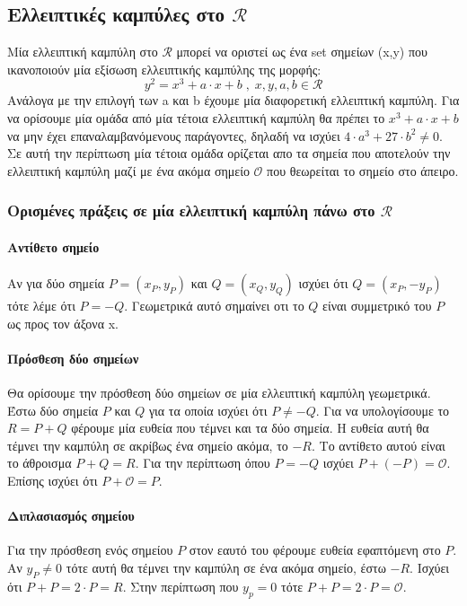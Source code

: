 \documentclass[12pt]{article}
\begin{document}
\subsection{Ελλειπτικές καμπύλες στο $\mathcal{R}$}
Μία ελλειπτική καμπύλη στο $\mathcal{R}$ μπορεί να οριστεί ως ένα set σημείων (x,y) που ικανοποιούν μία εξίσωση ελλειπτικής καμπύλης της μορφής: 
$$y^2 = x^3 + a \cdot x + b \; , \; x,y,a,b \in \mathcal{R}$$
Ανάλογα με την επιλογή των a και b έχουμε μία διαφορετική ελλειπτική καμπύλη. Για να ορίσουμε μία ομάδα από μία τέτοια ελλειπτική καμπύλη θα πρέπει το $x^3 + a \cdot x + b$ να μην έχει επαναλαμβανόμενους παράγοντες, δηλαδή να ισχύει $4 \cdot a^3 + 27 \cdot b^2 \neq 0$. Σε αυτή την περίπτωση μία τέτοια ομάδα ορίζεται απο τα σημεία που αποτελούν την ελλειπτική καμπύλη μαζί με ένα ακόμα σημείο $\mathcal{O}$ που θεωρείται το σημείο στο άπειρο.
\subsubsection{Ορισμένες πράξεις σε μία ελλειπτική καμπύλη πάνω στο $\mathcal{R}$}
\paragraph{Αντίθετο σημείο}
Αν για δύο σημεία $P = (x_P, y_P)$ και $Q = (x_Q, y_Q)$ ισχύει ότι $Q = (x_P, -y_P)$ τότε λέμε ότι $P = -Q$. Γεωμετρικά αυτό σημαίνει οτι το $Q$ είναι συμμετρικό του $P$ ως προς τον άξονα x.
\paragraph{Πρόσθεση δύο σημείων}
Θα ορίσουμε την πρόσθεση δύο σημείων σε μία ελλειπτική καμπύλη γεωμετρικά. Έστω δύο σημεία $P$ και $Q$ για τα οποία ισχύει ότι $P \neq -Q$. Για να υπολογίσουμε το $R = P + Q$ φέρουμε μία ευθεία που τέμνει και τα δύο σημεία. Η ευθεία αυτή θα τέμνει την καμπύλη σε ακρίβως ένα σημείο ακόμα, το $-R$. Το αντίθετο αυτού είναι το άθροισμα $P+Q = R$. 
Για την περίπτωση όπου $P = -Q$ ισχύει $P + (-P) = \mathcal{O}$.
Επίσης ισχύει ότι $P +\mathcal{O} = P$.
\paragraph{Διπλασιασμός σημείου}
Για την πρόσθεση ενός σημείου $P$ στον εαυτό του φέρουμε ευθεία εφαπτόμενη στο $P$. Αν $y_P \neq 0$ τότε αυτή θα τέμνει την καμπύλη σε ένα ακόμα σημείο, έστω $-R$. Ισχύει ότι $P + P = 2 \cdot P = R$.
Στην περίπτωση που $y_p = 0$ τότε $P + P = 2 \cdot P = \mathcal{O}$.
\end{document}
